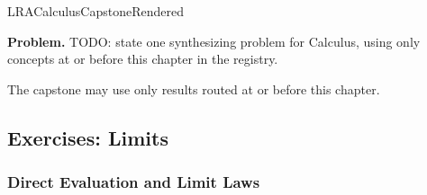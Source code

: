 \ifcsname LRACalculusCapstoneRendered\endcsname
\else
\expandafter\gdef\csname LRACalculusCapstoneRendered\endcsname{}

\newpage
{}
\label{cap:computational-calculus}

\begin{tcolorbox}[
  colback=gray!6,
  colframe=gray!40,
  arc=2pt,
  left=8pt, right=8pt, top=6pt, bottom=6pt,
  title={\small\textbf{Capstone Problem}},
  fonttitle=\small\bfseries
]
\textbf{Problem.}
TODO: state one synthesizing problem for Calculus, using only concepts at or
before this chapter in the registry.
\end{tcolorbox}

\begin{remark*}
The capstone may use only results routed at or before this chapter.
\end{remark*}



\subsection*{Exercises: Limits}

\subsubsection*{Direct Evaluation and Limit Laws}


